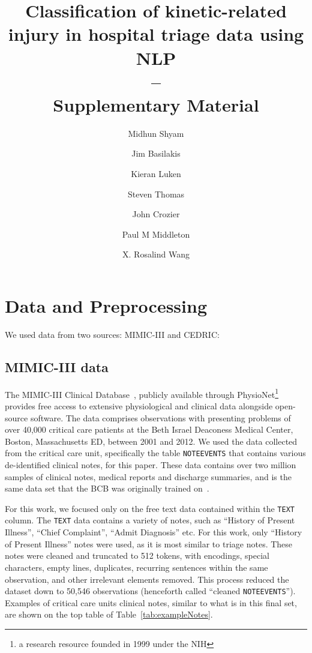 \documentclass[a4paper,12pt]{article}
\title{Classification of kinetic-related injury in hospital triage data using NLP\\
-- \\
Supplementary Material}
\author{Midhun Shyam\orcidlink{0009-0006-2930-2135} \and
Jim Basilakis\orcidlink{0000-0002-7440-1320} \and
Kieran Luken\orcidlink{0000-0002-6147-693X} \and
Steven Thomas\orcidlink{0000-0002-2416-0020} \and
John Crozier\orcidlink{0000-0002-4773-8518} \and
Paul M Middleton\orcidlink{0000-0003-0760-1098} \and
X. Rosalind Wang\orcidlink{0000-0001-5454-6197}}
\date{}
\newcommand{\mimic}{\ac{MIMIC}-III\xspace}
\newcommand{\cedric}{\ac{CEDRIC}\xspace}
\begin{document}
\maketitle

\section{Data and Preprocessing}


We used data from two sources: \ac{MIMIC}-III and \cedric: 


\subsection{\ac{MIMIC}-III data}

The \mimic Clinical Database~\cite{johnson2016mimic3db}, publicly available through PhysioNet\footnote{a research resource founded in 1999 under the \ac{NIH}}~\cite{goldberger2000physiobank} provides free access to extensive physiological and clinical data alongside open-source software. The data comprises observations with presenting problems of over 40,000 critical care patients at the Beth Israel Deaconess Medical Center, Boston, Massachusetts \ac{ED}, between 2001 and 2012. 
We used the data collected from the critical care unit, specifically the table \texttt{NOTEEVENTS} that contains various de-identified clinical notes, for this paper. These data contains over two million samples of clinical notes, medical reports and discharge summaries, and is the same data set that the \ac{BCB} was originally trained on~\cite{alsentzer2019publicly}. 

For this work, we focused only on the free text data contained within the \texttt{TEXT} column. The \texttt{TEXT} data contains a variety of notes, 
such as ``History of Present Illness'', ``Chief Complaint'', ``Admit Diagnosis'' etc. For this work, only ``History of Present Illness'' notes were used, as it is most similar to triage notes. 
These notes were cleaned and truncated to 512 tokens, with encodings, special characters, empty lines, duplicates, recurring sentences within the same observation, and other irrelevant elements removed. This process reduced the dataset down to 
50,546 observations (henceforth called ``cleaned \texttt{NOTEEVENTS}''). Examples of critical care units clinical notes, similar to what is in this final set, are shown on the top table of Table~\ref{tab:exampleNotes}. 
\end{document}
